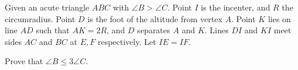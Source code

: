 Given an acute triangle $ ABC$ with $ \angle B > \angle C$. Point $ I$ is the incenter, and $ R$ the circumradius. Point $ D$ is the foot of the altitude from vertex $ A$. Point $ K$ lies on line $ AD$ such that $ AK = 2R$,  and $ D$ separates $ A$ and $ K$. Lines $ DI$ and $ KI$ meet sides $ AC$ and $ BC$ at $ E,F$ respectively. Let $ IE = IF$.

Prove that $ \angle B\leq 3\angle C$.